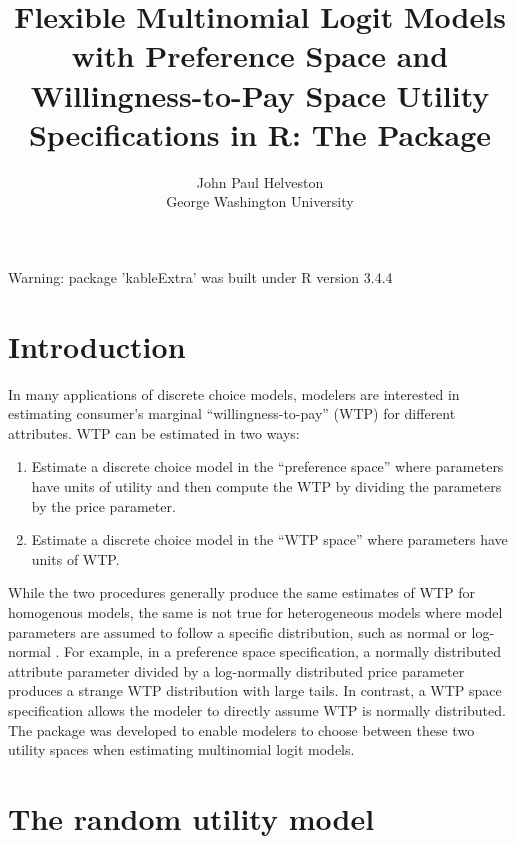 \documentclass[article]{jss}
\author{
John Paul Helveston\\George Washington University
}
\title{Flexible Multinomial Logit Models with Preference Space and
Willingness-to-Pay Space Utility Specifications in R: The \pkg{logitr}
Package}
\providecommand{\tightlist}{%
  \setlength{\itemsep}{0pt}\setlength{\parskip}{0pt}}
\begin{document}
\newcommand{\betaVec}{\boldsymbol\upbeta}
\newcommand{\omegaVec}{\boldsymbol\upomega}
\newcommand{\zetaVec}{\boldsymbol\upzeta}
\newcommand{\deltaVec}{\boldsymbol\updelta}
\newcommand{\gammaVec}{\boldsymbol\upgamma}
\newcommand{\epsilonVec}{\boldsymbol\upepsilon}
\newcommand{\xVec}{\mathrm{\mathbf{x}}}
\newcommand{\XVec}{\mathrm{\mathbf{X}}}

\begin{CodeChunk}

\begin{CodeOutput}
Warning: package 'kableExtra' was built under R version 3.4.4
\end{CodeOutput}
\end{CodeChunk}

\hypertarget{introduction}{%
\section{Introduction}\label{introduction}}

In many applications of discrete choice models, modelers are interested
in estimating consumer's marginal ``willingness-to-pay'' (WTP) for
different attributes. WTP can be estimated in two ways:

\begin{enumerate}
\def\labelenumi{\arabic{enumi}.}
\tightlist
\item
  Estimate a discrete choice model in the ``preference space'' where
  parameters have units of utility and then compute the WTP by dividing
  the parameters by the price parameter.
\item
  Estimate a discrete choice model in the ``WTP space'' where parameters
  have units of WTP.
\end{enumerate}

While the two procedures generally produce the same estimates of WTP for
homogenous models, the same is not true for heterogeneous models where
model parameters are assumed to follow a specific distribution, such as
normal or log-normal \citep{Train2005}. For example, in a preference
space specification, a normally distributed attribute parameter divided
by a log-normally distributed price parameter produces a strange WTP
distribution with large tails. In contrast, a WTP space specification
allows the modeler to directly assume WTP is normally distributed. The
 package was developed to enable modelers to choose between
these two utility spaces when estimating multinomial logit models.

\hypertarget{the-random-utility-model}{%
\section{The random utility model}\label{the-random-utility-model}}
\end{document}
